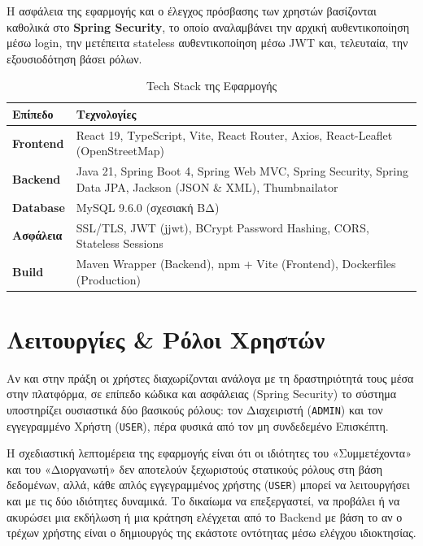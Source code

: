 \documentclass[12pt]{fphw}
\newcommand{\en}[1]{\foreignlanguage{english}{#1}}
\begin{document}
Η ασφάλεια της εφαρμογής και ο έλεγχος πρόσβασης των χρηστών βασίζονται καθολικά στο \en{\textbf{Spring Security}}, το οποίο αναλαμβάνει την αρχική αυθεντικοποίηση μέσω login, την μετέπειτα \en{stateless} αυθεντικοποίηση μέσω \en{JWT} και, τελευταία, την εξουσιοδότηση βάσει ρόλων.

\begin{table}[h!]
    \centering
    \small
    \begin{tabularx}{\textwidth}{lX}
    \toprule
    \textbf{Επίπεδο} & \textbf{Τεχνολογίες} \\
    \midrule
    \en{\textbf{Frontend}} & \en{React 19, TypeScript, Vite, React Router, Axios, React-Leaflet (OpenStreetMap)} \\
    \addlinespace[4pt]
    \en{\textbf{Backend}} & \en{Java 21, Spring Boot 4, Spring Web MVC, Spring Security, Spring Data JPA, Jackson (JSON \& XML), Thumbnailator} \\
    \addlinespace[4pt]
    \en{\textbf{Database}} & \en{MySQL 9.6.0} (σχεσιακή ΒΔ) \\
    \addlinespace[4pt]
    \en{\textbf{Ασφάλεια}} & \en{SSL/TLS, JWT (jjwt), BCrypt Password Hashing, CORS, Stateless Sessions} \\
    \addlinespace[4pt]
    \en{\textbf{Build}} & \en{Maven Wrapper (Backend), npm + Vite (Frontend), Dockerfiles (Production)} \\
    \bottomrule
    \end{tabularx}
    \caption{Tech Stack της Εφαρμογής}
\end{table}

\newpage

\section{Λειτουργίες \& Ρόλοι Χρηστών}
Αν και στην πράξη οι χρήστες διαχωρίζονται ανάλογα με τη δραστηριότητά τους μέσα στην πλατφόρμα, σε επίπεδο κώδικα και ασφάλειας (\en{Spring Security}) το σύστημα υποστηρίζει ουσιαστικά δύο βασικούς ρόλους: τον Διαχειριστή (\en{\texttt{ADMIN}}) και τον εγγεγραμμένο Χρήστη (\en{\texttt{USER}}), πέρα φυσικά από τον μη συνδεδεμένο Επισκέπτη.

Η σχεδιαστική λεπτομέρεια της εφαρμογής είναι ότι οι ιδιότητες του «Συμμετέχοντα» και του «Διοργανωτή» δεν αποτελούν ξεχωριστούς στατικούς ρόλους στη βάση δεδομένων, αλλά, κάθε απλός εγγεγραμμένος χρήστης (\en{\texttt{USER}}) μπορεί να λειτουργήσει και με τις δύο ιδιότητες δυναμικά. Το δικαίωμα να επεξεργαστεί, να προβάλει ή να ακυρώσει μια εκδήλωση ή μια κράτηση ελέγχεται από το \en{Backend} με βάση το αν ο τρέχων χρήστης είναι ο δημιουργός της εκάστοτε οντότητας μέσω ελέγχου ιδιοκτησίας.
\end{document}

